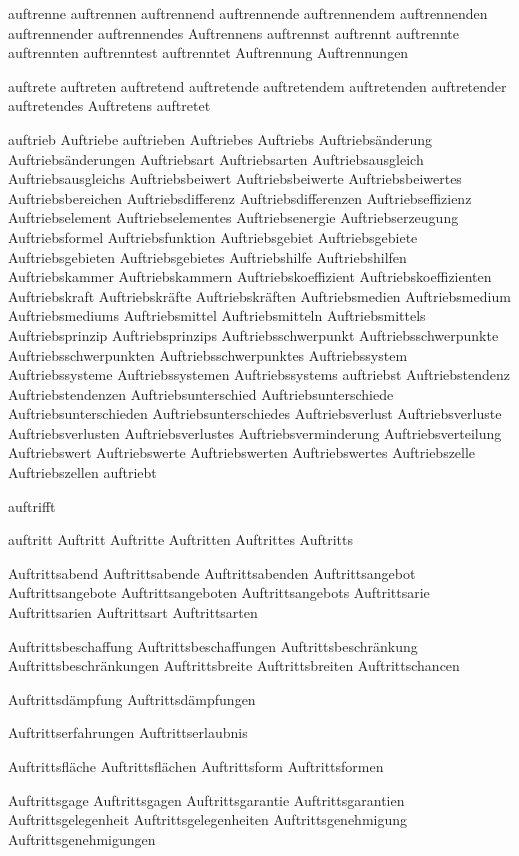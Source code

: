 auftrenne
auftrennen
auftrennend
auftrennende
auftrennendem
auftrennenden
auftrennender
auftrennendes
Auftrennens
auftrennst
auftrennt
auftrennte
auftrennten
auftrenntest
auftrenntet
Auftrennung
Auftrennungen

auftrete
auftreten
auftretend
auftretende
auftretendem
auftretenden
auftretender
auftretendes
Auftretens
auftretet

auftrieb
Auftriebe
auftrieben
Auftriebes
Auftriebs
Auftriebsänderung
Auftriebsänderungen
Auftriebsart
Auftriebsarten
Auftriebsausgleich
Auftriebsausgleichs
Auftriebsbeiwert
Auftriebsbeiwerte
Auftriebsbeiwertes
Auftriebsbereichen
Auftriebsdifferenz
Auftriebsdifferenzen
Auftriebseffizienz
Auftriebselement
Auftriebselementes
Auftriebsenergie
Auftriebserzeugung
Auftriebsformel
Auftriebsfunktion
Auftriebsgebiet
Auftriebsgebiete
Auftriebsgebieten
Auftriebsgebietes
Auftriebshilfe
Auftriebshilfen
Auftriebskammer
Auftriebskammern
Auftriebskoeffizient
Auftriebskoeffizienten
Auftriebskraft
Auftriebskräfte
Auftriebskräften
Auftriebsmedien
Auftriebsmedium
Auftriebsmediums
Auftriebsmittel
Auftriebsmitteln
Auftriebsmittels
Auftriebsprinzip
Auftriebsprinzips
Auftriebsschwerpunkt
Auftriebsschwerpunkte
Auftriebsschwerpunkten
Auftriebsschwerpunktes
Auftriebssystem
Auftriebssysteme
Auftriebssystemen
Auftriebssystems
auftriebst
Auftriebstendenz
Auftriebstendenzen
Auftriebsunterschied
Auftriebsunterschiede
Auftriebsunterschieden
Auftriebsunterschiedes
Auftriebsverlust
Auftriebsverluste
Auftriebsverlusten
Auftriebsverlustes
Auftriebsverminderung
Auftriebsverteilung
Auftriebswert
Auftriebswerte
Auftriebswerten
Auftriebswertes
Auftriebszelle
Auftriebszellen
auftriebt

auftrifft

auftritt
Auftritt
Auftritte
Auftritten
Auftrittes
Auftritts

Auftrittsabend
Auftrittsabende
Auftrittsabenden
Auftrittsangebot
Auftrittsangebote
Auftrittsangeboten
Auftrittsangebots
Auftrittsarie
Auftrittsarien
Auftrittsart
Auftrittsarten

Auftrittsbeschaffung
Auftrittsbeschaffungen
Auftrittsbeschränkung
Auftrittsbeschränkungen
Auftrittsbreite
Auftrittsbreiten
Auftrittschancen

Auftrittsdämpfung
Auftrittsdämpfungen

Auftrittserfahrungen
Auftrittserlaubnis

Auftrittsfläche
Auftrittsflächen
Auftrittsform
Auftrittsformen

Auftrittsgage
Auftrittsgagen
Auftrittsgarantie
Auftrittsgarantien
Auftrittsgelegenheit
Auftrittsgelegenheiten
Auftrittsgenehmigung
Auftrittsgenehmigungen

